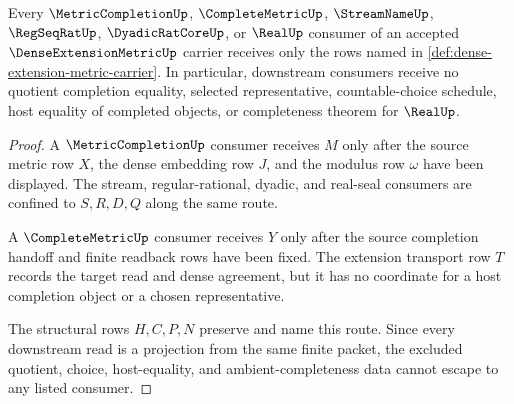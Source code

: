 \begin{theorem}
\label{thm:dense-extension-metric-downstream-non-escape}
Every $\MetricCompletionUp$, $\CompleteMetricUp$, $\StreamNameUp$, $\RegSeqRatUp$, $\DyadicRatCoreUp$, or $\RealUp$ consumer of an accepted $\DenseExtensionMetricUp$ carrier receives only the rows named in \autoref{def:dense-extension-metric-carrier}. In particular, downstream consumers receive no quotient completion equality, selected representative, countable-choice schedule, host equality of completed objects, or completeness theorem for $\RealUp$.
\end{theorem}
\begin{proof}
A $\MetricCompletionUp$ consumer receives $M$ only after the source metric row $X$, the dense embedding row $J$, and the modulus row $\omega$ have been displayed. The stream, regular-rational, dyadic, and real-seal consumers are confined to $S,R,D,Q$ along the same route.

A $\CompleteMetricUp$ consumer receives $Y$ only after the source completion handoff and finite readback rows have been fixed. The extension transport row $T$ records the target read and dense agreement, but it has no coordinate for a host completion object or a chosen representative.

The structural rows $H,C,P,N$ preserve and name this route. Since every downstream read is a projection from the same finite packet, the excluded quotient, choice, host-equality, and ambient-completeness data cannot escape to any listed consumer.
\end{proof}


\begin{closurestatus}{\DenseExtensionMetricUp}
  \theoryclosure{\seedClosure}
  \formalstatus{\unformalizedV}
\end{closurestatus}
